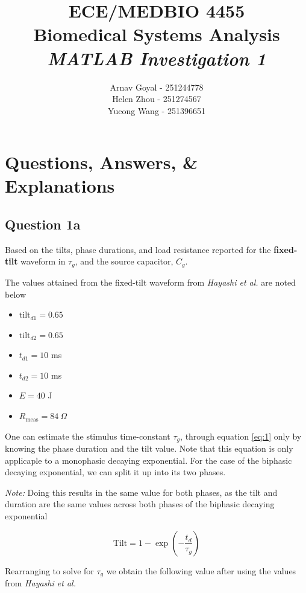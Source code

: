 \documentclass[]{report}
\title{\textbf{ECE/MEDBIO 4455} \\ Biomedical Systems Analysis \\ \textit{MATLAB Investigation 1}}
\author{Arnav Goyal - 251244778 \\ Helen Zhou - 251274567 \\ Yucong Wang - 251396651}
\begin{document}
\maketitle
\newpage
\tableofcontents
\newpage

\chapter*{Questions, Answers, \& Explanations}

\section*{Question 1a}

Based on the tilts, phase durations, and load resistance reported for the \textbf{fixed-tilt} waveform in $\tau_g$, and the source 
capacitor, $C_g$.


The values attained from the fixed-tilt waveform from \textit{Hayashi et al.} are noted below

\begin{itemize}
 	\item $\text{tilt}_{d1}  = 0.65$ 
 	\item $\text{tilt}_{d2}  = 0.65$
	\item $t_{d1} = 10$ ms
	\item $t_{d2} = 10$ ms
	\item $E        = 40$ J
	\item $R_\text{meas}   = 84 \ \Omega$
\end{itemize}
 
One can estimate the stimulus time-constant $\tau_g$, through equation \ref{eq:1} only by knowing the phase duration and the tilt value. Note that this equation is only applicaple to a monophasic decaying exponential. For the case of the biphasic decaying exponential, we can split it up into its two phases.

\textit{Note:} Doing this results in the same value for both phases, as the tilt and duration are the same values across both phases of the biphasic decaying exponential

\begin{equation}
\label{eq:1}
	\text{Tilt} = 1 - \exp{\left( - \frac{t_d}{\tau_g} \right)}
\end{equation}

Rearranging to solve for $\tau_g$ we obtain  the following value after using the values from \textit{Hayashi et al.}
\end{document}
